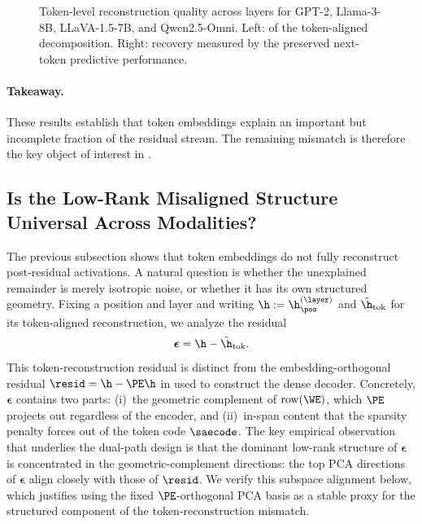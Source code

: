 \documentclass{article}
\begin{document}
\begin{figure}[t]
  \centering
  \caption{
    Token-level reconstruction quality across layers for GPT-2, Llama-3-8B, LLaVA-1.5-7B, and Qwen2.5-Omni.
    Left:  of the token-aligned decomposition.
    Right:  recovery measured by the preserved next-token predictive performance.
  }
  \label{fig:token_recovery}
\end{figure}

\paragraph{Takeaway.}
These results establish that token embeddings explain an important but incomplete fraction of the residual stream.
The remaining mismatch is therefore the key object of interest in .

\subsection{Is the Low-Rank Misaligned Structure Universal Across Modalities?}
\label{subsec:lowrank_universal}

The previous subsection shows that token embeddings do not fully reconstruct post-residual activations.
A natural question is whether the unexplained remainder is merely isotropic noise, or whether it has its own structured geometry.
Fixing a position and layer and writing $\h := \h_{\pos}^{(\layer)}$ and $\tilde{\h}_{\text{tok}}$ for its token-aligned reconstruction, we analyze the residual
\begin{equation}
  \boldsymbol{\epsilon} = \h - \tilde{\h}_{\text{tok}}.
\end{equation}
This token-reconstruction residual is distinct from the embedding-orthogonal residual $\resid = \h - \PE\h$ in  used to construct the dense decoder.
Concretely, $\boldsymbol{\epsilon}$ contains two parts: (i)~the geometric complement of $\mathrm{row}(\WE)$, which $\PE$ projects out regardless of the encoder, and (ii)~in-span content that the sparsity penalty forces out of the token code $\saecode$.
The key empirical observation that underlies the dual-path design is that the dominant low-rank structure of $\boldsymbol{\epsilon}$ is concentrated in the geometric-complement directions: the top PCA directions of $\boldsymbol{\epsilon}$ align closely with those of $\resid$.
We verify this subspace alignment below, which justifies using the fixed $\PE$-orthogonal PCA basis as a stable proxy for the structured component of the token-reconstruction mismatch.
\end{document}
